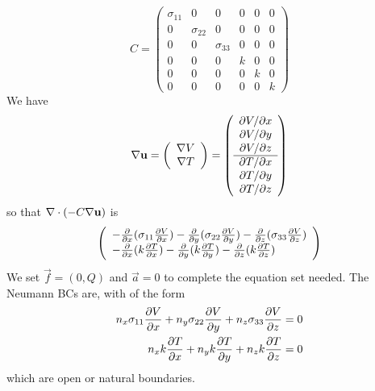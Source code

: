 \documentclass[a4paper,twoside,11pt]{book}
\begin{document}
\begin{equation}
  C=
  \left(\begin{array}{ccc|ccc}
    \sigma_{11} & 0 & 0 & 0 & 0 & 0\\
    0 & \sigma_{22} & 0 & 0 & 0 & 0\\
    0 & 0 & \sigma_{33} & 0 & 0 & 0\\ \hline
    0 & 0 & 0 & k & 0 & 0\\
    0 & 0 & 0 & 0 & k & 0\\
    0 & 0 & 0 & 0 & 0 & k
  \end{array}\right)
  \label{Cthermo}
\end{equation}
We have
\begin{equation}
  \nabla\mathbf{u} =
  \left(\begin{array}{c}
    \nabla V\\
    \nabla T
  \end{array}\right)
=
  \left(\begin{array}{c}
    \partial V/\partial x\\
    \partial V/\partial y\\
    \partial V/\partial z\\ \hline
    \partial T/\partial x\\
    \partial T/\partial y\\
    \partial T/\partial z
  \end{array}\right)
\end{equation}
so that $\nabla\cdot(-C\nabla\mathbf{u})$ is
\begin{equation}
  \left(\begin{array}{l}
      -\frac{\partial}{\partial x}(\sigma_{11} \frac{\partial V}{\partial x})
      -\frac{\partial}{\partial y}(\sigma_{22} \frac{\partial V}{\partial y})
      -\frac{\partial}{\partial z}(\sigma_{33} \frac{\partial V}{\partial z})\\
      -\frac{\partial}{\partial x}(k \frac{\partial T}{\partial x})
      -\frac{\partial}{\partial y}(k \frac{\partial T}{\partial y})
      -\frac{\partial}{\partial z}(k \frac{\partial T}{\partial z})
  \end{array}\right)
\end{equation}
We set $\vec f=(0,Q)$ and $\vec
a=0$ to complete the equation set needed. The Neumann BCs are, with  of the form
\begin{eqnarray}
  n_x\sigma_{11} \frac{\partial V}{\partial x}+n_y\sigma_{22} \frac{\partial V}{\partial y}
+n_z\sigma_{33} \frac{\partial V}{\partial z}=0 \label{Vneu}\\
  n_x k \frac{\partial T}{\partial x}+n_y k \frac{\partial T}{\partial y}+n_z k \frac{\partial T}{\partial z}=0 \label{Tneu}
\end{eqnarray}
which are open or natural boundaries.
\end{document}
